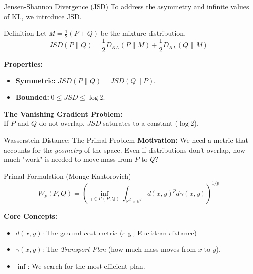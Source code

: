 \documentclass[10pt,aspectratio=169]{ntuabeamer}
\newcommand{\R}{\mathbb{R}}
\begin{document}
	\begin{frame}{Jensen-Shannon Divergence (JSD)}
		To address the asymmetry and infinite values of KL, we introduce JSD.
		\begin{block}{Definition}
			Let $M = \frac{1}{2}(P + Q)$ be the mixture distribution.
			$$ JSD(P \| Q) = \frac{1}{2} D_{KL}(P \| M) + \frac{1}{2} D_{KL}(Q \| M) $$
		\end{block}
		
		\textbf{Properties:}
		\begin{itemize}
			\item \textbf{Symmetric:} $JSD(P\|Q) = JSD(Q\|P)$.
			\item \textbf{Bounded:} $0 \le JSD \le \log 2$.
		\end{itemize}
		
		\vspace{1em}
		\textbf{The Vanishing Gradient Problem:}\\
		If $P$ and $Q$ do not overlap, $JSD$ saturates to a constant ($\log 2$).
	
	\end{frame}
	
	\begin{frame}{Wasserstein Distance: The Primal Problem}
		\textbf{Motivation:} We need a metric that accounts for the \textit{geometry} of the space.
		Even if distributions don't overlap, how much "work" is needed to move mass from $P$ to $Q$?
		
		\begin{block}{Primal Formulation (Monge-Kantorovich)}
			$$ W_p(P, Q) = \left( \inf_{\gamma \in \Pi(P, Q)} \int_{\R^d \times \R^d} d(x, y)^p d\gamma(x, y) \right)^{1/p} $$
		\end{block}
		
		\textbf{Core Concepts:}
		\begin{itemize}
			\item $d(x,y)$: The ground cost metric (e.g., Euclidean distance).
			\item $\gamma(x, y)$: The \textit{Transport Plan} (how much mass moves from $x$ to $y$).
			\item $\inf$: We search for the most efficient plan.
		\end{itemize}
	\end{frame}
	
\end{document}
